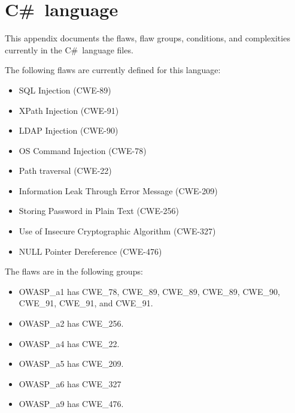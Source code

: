 \documentclass[12pt]{article}
\newcommand{\CSharp}{C{\fontseries{b}\selectfont\#}}
\begin{document}



\newpage

%
%

\clearpage

\appendix

\section{\CSharp\ language}
\label{sec:CSharp language}

This appendix documents the flaws, flaw groups, conditions, and complexities
currently in the
\CSharp\ language files.

The following flaws are currently defined for this language:
\begin{itemize}
    \item SQL Injection (CWE-89)
    \item XPath Injection (CWE-91)
    \item LDAP Injection (CWE-90)
    \item OS Command Injection (CWE-78)
    \item Path traversal (CWE-22)
    \item Information Leak Through Error Message (CWE-209)
    \item Storing Password in Plain Text (CWE-256)
    \item Use of Insecure Cryptographic Algorithm (CWE-327)
    \item NULL Pointer Dereference (CWE-476)
\end{itemize}

The flaws are in the following groups:
\begin{itemize}
    \item OWASP\_a1 has CWE\_78, CWE\_89, CWE\_89, CWE\_89, CWE\_90, CWE\_91,
      CWE\_91, and CWE\_91.
    \item OWASP\_a2 has CWE\_256.
    \item OWASP\_a4 has CWE\_22.
    \item OWASP\_a5 has CWE\_209.
    \item OWASP\_a6 has CWE\_327
    \item OWASP\_a9 has CWE\_476.
\end{itemize}
\end{document}
